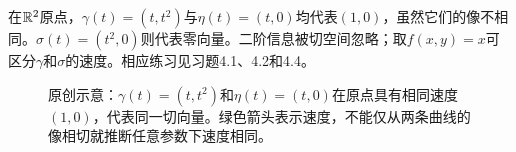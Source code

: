 \begin{example}[速度相同不代表曲线相同]
在$\mathbb{R}^2$原点，$\gamma(t)=(t,t^2)$与$\eta(t)=(t,0)$均代表$(1,0)$，虽然它们的像不相同。$\sigma(t)=(t^2,0)$则代表零向量。二阶信息被切空间忽略；取$f(x,y)=x$可区分$\gamma$和$\sigma$的速度。相应练习见习题4.1、4.2和4.4。
\end{example}
\begin{figure}[htbp]
\centering

\caption{原创示意：$\gamma(t)=(t,t^2)$和$\eta(t)=(t,0)$在原点具有相同速度$(1,0)$，代表同一切向量。绿色箭头表示速度，不能仅从两条曲线的像相切就推断任意参数下速度相同。}
\label{fig:tangent-equivalence}
\end{figure}
